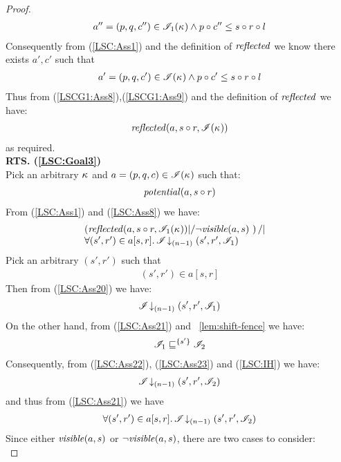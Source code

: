 \begin{lemma}
\begin{proof}
\begin{align*}
	a'' = (p, q, c'') \in \mathscr{I}_1(\kappa_{}) \land p \circ c'' \leq s \circ r \circ l
\end{align*}
%
Consequently from (\ref{LSC:Ass1}) and the definition of $\mathit{reflected}$ we know there exists $a', c'$ such that
%
\begin{align}
	a' = (p, q, c') \in \mathscr{I}(\kappa_{}) \land p \circ c' \leq s \circ r \circ l
	\label{LSCG1:Ass9}
\end{align}
%
Thus from (\ref{LSCG1:Ass8}),(\ref{LSCG1:Ass9}) and the definition of $\mathit{reflected}$ we have:
%
\begin{align*}
	\mathit{reflected}(a, s \circ r, \mathscr{I}(\kappa_{}))
\end{align*}
%
as required.\\

\noindent\textbf{RTS. (\ref{LSC:Goal3})}\\
Pick an arbitrary $\kappa_{}$ and $a = (p, q, c) \in \mathscr{I}(\kappa_{})$ such that:
%
\begin{align}
	\mathit{potential}(a, s \circ r)\label{LSC:Ass8}
\end{align}
%
From (\ref{LSC:Ass1}) and (\ref{LSC:Ass8}) we have:
%
\begin{align}
	& \begin{array}{@{} l @{}}
		\left(\m{reflected}(a, s \composeL r, \lmod_1(\ca{})) |/ \neg\m{visible}(a, s) \ \right) /| \\
		\for{(s', r') \in a[s, r]} \extendsAMUpto{\lmod}{(n-1)}{s'}{r'}{\lmod_1}
	\end{array}
	\label{LSC:Ass20}
\end{align}
%
Pick an arbitrary $(s', r')$ such that 
%
\begin{align}
	(s', r') \in a[s, r] \label{LSC:Ass21}
\end{align}
%
Then from (\ref{LSC:Ass20}) we have:
%
\begin{align}
	\mathscr{I} \!\downarrow_{(n-1)} \left(s', r', \mathscr{I}_1\right)
	\label{LSC:Ass22}
\end{align}
%
On the other hand, from (\ref{LSC:Ass21}) and \lem~\ref{lem:shift-fence} we have:
%
\begin{align}
	\mathscr{I}_1 \sqsubseteq^{\{s'\}} \mathscr{I}_2 
	\label{LSC:Ass23}
\end{align}
%
Consequently, from (\ref{LSC:Ass22}), (\ref{LSC:Ass23}) and (\ref{LSC:IH}) we have:
%
\begin{align*}
	\mathscr{I} \!\downarrow_{(n-1)} \left(s', r', \mathscr{I}_2\right)
\end{align*}
%
and thus from (\ref{LSC:Ass21}) we have
%
\begin{align}
	\forall (s', r') \in a[s, r].\, \mathscr{I} \!\downarrow_{(n-1)} \left(s', r', \mathscr{I}_2\right)
	\label{LSC:Ass24}
\end{align}
%
Since either $\mathit{visible}(a, s)$ or $\neg\mathit{visible}(a, s)$, there are two cases to consider:\\


\end{proof}
\end{lemma}
